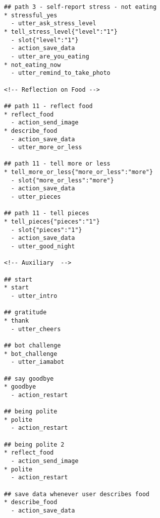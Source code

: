 \begin{lstlisting}
## path 3 - self-report stress - not eating
* stressful_yes
  - utter_ask_stress_level
* tell_stress_level{"level":"1"}
  - slot{"level":"1"}
  - action_save_data
  - utter_are_you_eating
* not_eating_now
  - utter_remind_to_take_photo

<!-- Reflection on Food -->

## path 11 - reflect food
* reflect_food
  - action_send_image
* describe_food
  - action_save_data
  - utter_more_or_less

## path 11 - tell more or less
* tell_more_or_less{"more_or_less":"more"}
  - slot{"more_or_less":"more"}
  - action_save_data
  - utter_pieces

## path 11 - tell pieces
* tell_pieces{"pieces":"1"}
  - slot{"pieces":"1"}
  - action_save_data
  - utter_good_night

<!-- Auxiliary  -->

## start
* start
  - utter_intro

## gratitude
* thank
  - utter_cheers

## bot challenge
* bot_challenge
  - utter_iamabot

## say goodbye
* goodbye
  - action_restart

## being polite
* polite
  - action_restart

## being polite 2
* reflect_food
  - action_send_image
* polite
  - action_restart

## save data whenever user describes food
* describe_food
  - action_save_data
\end{lstlisting}
